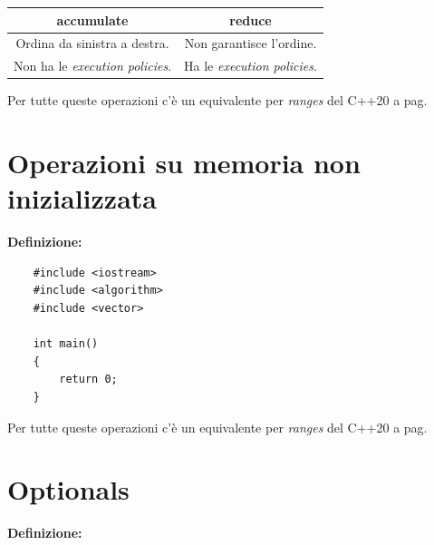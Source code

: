 \begin{tabular}{|c|c|}
	\hline
	\textbf{accumulate} & \textbf{reduce} \\
	\hline
	\textsf{\small Ordina da sinistra a destra.} & \textsf{\small Non garantisce l'ordine.} \\
	\hline
	\textsf{\small Non ha le \emph{execution policies}.} & \textsf{\small Ha le \emph{execution policies}.} \\
	\hline
\end{tabular}

\fleuron

\textsf{\small Per tutte queste operazioni c'è un equivalente per \emph{ranges} del C++20 a pag. \pageref{ranges}} \\


\newpage

\section{Operazioni su memoria non inizializzata}

\textsf{\small \textbf{Definizione: } } \\

\begin{lstlisting}
	#include <iostream>
	#include <algorithm>
	#include <vector>
	
	int main()
	{
		return 0;
	}
\end{lstlisting}

\fleuron

\textsf{\small Per tutte queste operazioni c'è un equivalente per \emph{ranges} del C++20 a pag. \pageref{ranges}} \\


\newpage

\section{Optionals}


\textsf{\small \textbf{Definizione: } } \\


